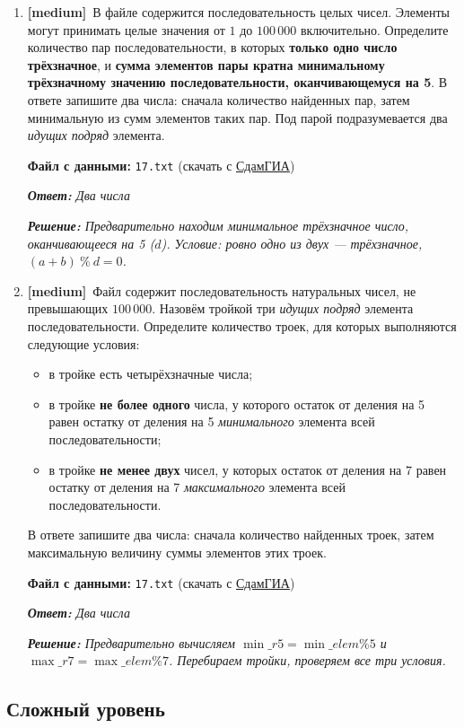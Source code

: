 \documentclass[a4paper]{article}
\newcommand{\medtag}{\textcolor{medcolor}{\textbf{[medium]}}}
\newcommand{\answer}[1]{\par\smallskip\textit{\textbf{Ответ:} #1}}
\newcommand{\solution}[1]{\par\textit{\textbf{Решение:} #1}}
\newcommand{\filehint}[1]{\par\smallskip\textbf{Файл с данными:} \texttt{#1} (скачать с \href{https://inf-ege.sdamgia.ru/}{СдамГИА})}
\begin{document}
\begin{enumerate}[label=\textbf{Задача \arabic*.}, leftmargin=*, itemsep=10mm]
  \bigskip

  \item %
  \medtag\ В файле содержится последовательность целых чисел.
  Элементы могут принимать целые значения от $1$ до $100\,000$ включительно.
  Определите количество пар последовательности, в которых \textbf{только одно
  число трёхзначное}, и \textbf{сумма элементов пары кратна минимальному
  трёхзначному значению последовательности, оканчивающемуся на 5}.
  В ответе запишите два числа: сначала количество найденных пар, затем
  минимальную из сумм элементов таких пар.
  Под парой подразумевается два \emph{идущих подряд} элемента.
  \filehint{17.txt}
  \answer{Два числа}
  \solution{Предварительно находим минимальное трёхзначное число, оканчивающееся на 5 ($d$). Условие: ровно одно из двух — трёхзначное, $(a+b)\ \%\ d = 0$.}

  \bigskip

  \item %
  \medtag\ Файл содержит последовательность натуральных чисел, не превышающих $100\,000$.
  Назовём тройкой три \emph{идущих подряд} элемента последовательности.
  Определите количество троек, для которых выполняются следующие условия:
  \begin{itemize}
    \item в тройке есть четырёхзначные числа;
    \item в тройке \textbf{не более одного} числа, у которого остаток от деления
    на 5 равен остатку от деления на 5 \emph{минимального} элемента всей
    последовательности;
    \item в тройке \textbf{не менее двух} чисел, у которых остаток от деления на 7
    равен остатку от деления на 7 \emph{максимального} элемента всей
    последовательности.
  \end{itemize}
  В ответе запишите два числа: сначала количество найденных троек, затем
  максимальную величину суммы элементов этих троек.
  \filehint{17.txt}
  \answer{Два числа}
  \solution{Предварительно вычисляем $\min\_r5 = \min\_elem \% 5$ и $\max\_r7 = \max\_elem \% 7$. Перебираем тройки, проверяем все три условия.}

\end{enumerate}

\bigskip


\subsection*{\textcolor{hardcolor}{Сложный уровень}}
\end{document}

